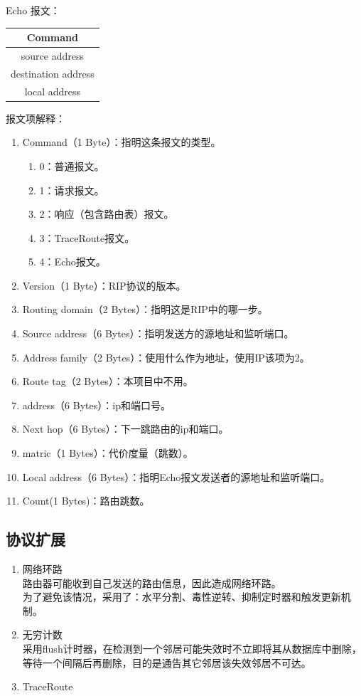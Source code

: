 	Echo 报文：
	\begin{table}[H]
	\centering
		\begin{tabular}{|c|}
			\hline
			Command \\
			\hline
			source address \\
			\hline
			destination address \\
			\hline
			local address \\
			\hline
		\end{tabular}		
	\end{table}
	报文项解释：
	\begin{enumerate}
		\item Command（1 Byte）：指明这条报文的类型。
		\begin{enumerate}[]
			\item 0：普通报文。
			\item 1：请求报文。
			\item 2：响应（包含路由表）报文。
			\item 3：TraceRoute报文。
			\item 4：Echo报文。
		\end{enumerate}
		\item Version（1 Byte）：RIP协议的版本。
		\item Routing domain（2 Bytes）：指明这是RIP中的哪一步。
		\item Source address（6 Bytes）：指明发送方的源地址和监听端口。
		\item Address family（2 Bytes）：使用什么作为地址，使用IP该项为2。
		\item Route tag（2 Bytes）：本项目中不用。
		\item address（6 Bytes）：ip和端口号。
		\item Next hop（6 Bytes）：下一跳路由的ip和端口。
		\item matric（1 Bytes）：代价度量（跳数）。
		\item Local address（6 Bytes）：指明Echo报文发送者的源地址和监听端口。
		\item Count(1 Bytes)：路由跳数。
	\end{enumerate}
	\subsection{协议扩展} %
	\label{sub:协议扩展}
		\begin{enumerate}
			\item 网络环路\\
				路由器可能收到自己发送的路由信息，因此造成网络环路。\\
				为了避免该情况，采用了：水平分割、毒性逆转、抑制定时器和触发更新机制。
			\item 无穷计数\\
				采用flush计时器，在检测到一个邻居可能失效时不立即将其从数据库中删除，等待一个间隔后再删除，目的是通告其它邻居该失效邻居不可达。
			\item TraceRoute
		\end{enumerate}
